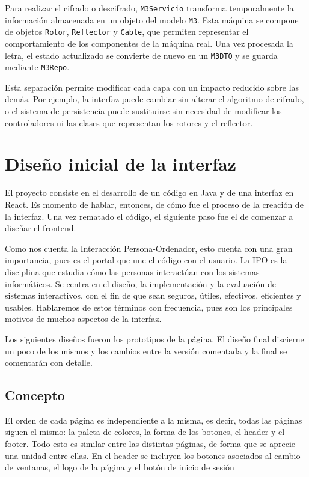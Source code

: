 Para realizar el cifrado o descifrado, \texttt{M3Servicio} transforma temporalmente la información almacenada en un objeto del modelo \texttt{M3}. Esta máquina se compone de objetos \texttt{Rotor}, \texttt{Reflector} y \texttt{Cable}, que permiten representar el comportamiento de los componentes de la máquina real. Una vez procesada la letra, el estado actualizado se convierte de nuevo en un \texttt{M3DTO} y se guarda mediante \texttt{M3Repo}.

Esta separación permite modificar cada capa con un impacto reducido sobre las demás. Por ejemplo, la interfaz puede cambiar sin alterar el algoritmo de cifrado, o el sistema de persistencia puede sustituirse sin necesidad de modificar los controladores ni las clases que representan los rotores y el reflector.

\section {Diseño inicial de la interfaz}

El proyecto consiste en el desarrollo de un código en Java y de una interfaz en React. Es momento de hablar, entonces, de cómo fue el proceso de la creación de la interfaz. Una vez rematado el código, el siguiente paso fue el de comenzar a diseñar el frontend. 

Como nos cuenta la Interacción Persona-Ordenador, esto cuenta con una gran importancia, pues es el portal que une el código con el usuario. La IPO es la disciplina que estudia cómo las personas interactúan con los sistemas informáticos. Se centra en el diseño, la implementación y la evaluación de sistemas interactivos, con el fin de que sean seguros, útiles, efectivos, eficientes y usables. Hablaremos de estos términos con frecuencia, pues son los principales motivos de muchos aspectos de la interfaz.

Los siguientes diseños fueron los prototipos de la página. El diseño final discierne un poco de los mismos y los cambios entre la versión comentada y la final se comentarán con detalle. 

\subsection{Concepto}
El orden de cada página es independiente a la misma, es decir, todas las páginas siguen el mismo: la paleta de colores, la forma de los botones, el header y el footer. Todo esto es similar entre las distintas páginas, de forma que se aprecie una unidad entre ellas. 
En el header se incluyen los botones asociados al cambio de ventanas, el logo de la página y el botón de inicio de sesión

